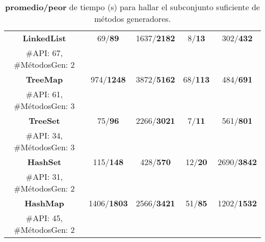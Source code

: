 \begin{table}[H]
\begin{tabular}{cccccc}
\multicolumn{2}{c}{\textbf{LinkedList}}     & 69/\textbf{89}     & 1637/\textbf{2182} & 8/\textbf{13}    & 302/\textbf{432}  \\
\multicolumn{2}{c}{\tiny \#API: 67, \#MétodosGen: 2} & & & & \\

\multicolumn{2}{c}{\textbf{TreeMap}}        & 974/\textbf{1248}  & 3872/\textbf{5162} & 68/\textbf{113}  & 484/\textbf{691}  \\
\multicolumn{2}{c}{\tiny \#API: 61, \#MétodosGen: 3} & & & & \\

\multicolumn{2}{c}{\textbf{TreeSet}}        & 75/\textbf{96}     & 2266/\textbf{3021} & 7/\textbf{11}    & 561/\textbf{801}  \\
\multicolumn{2}{c}{\tiny \#API: 34, \#MétodosGen: 3} & & & & \\

\multicolumn{2}{c}{\textbf{HashSet}}        & 115/\textbf{148}   & 428/\textbf{570}   & 12/\textbf{20}   & 2690/\textbf{3842} \\
\multicolumn{2}{c}{\tiny \#API: 31, \#MétodosGen: 2} & & & & \\

\multicolumn{2}{c}{\textbf{HashMap}}        & 1406/\textbf{1803} & 2566/\textbf{3421} & 51/\textbf{85}   & 1202/\textbf{1532} \\
\multicolumn{2}{c}{\tiny \#API: 45, \#MétodosGen: 2} & & & & \\
\hline
\end{tabular}

\caption{\textbf{promedio/peor} de tiempo (s) para hallar el subconjunto suficiente de métodos generadores.}
\label{tab:eficiencia}
\end{table}
